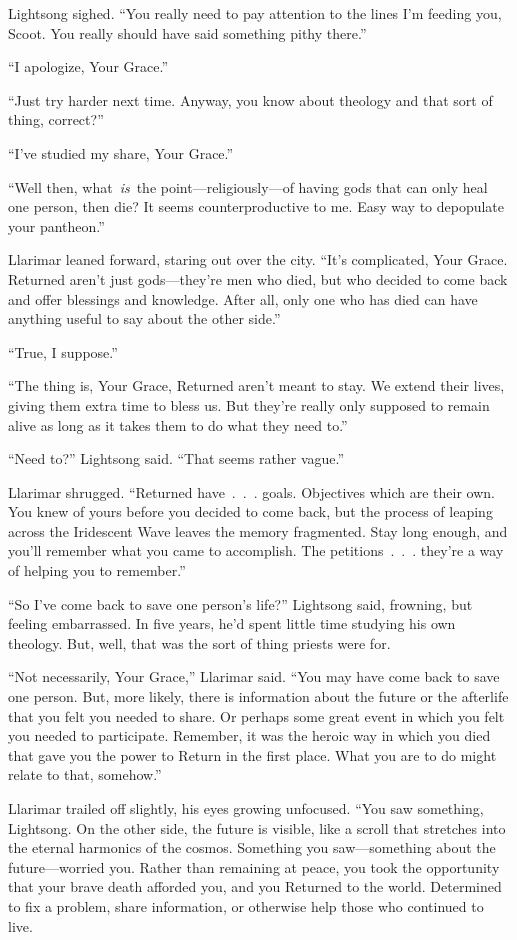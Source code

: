 Lightsong sighed. “You really need to pay attention to the lines I’m feeding you, Scoot. You really should have said something pithy there.”

“I apologize, Your Grace.”

“Just try harder next time. Anyway, you know about theology and that sort of thing, correct?”

“I’ve studied my share, Your Grace.”

“Well then, what~\textit{is}~the point—religiously—of having gods that can only heal one person, then die? It seems counterproductive to me. Easy way to depopulate your pantheon.”

Llarimar leaned forward, staring out over the city. “It’s complicated, Your Grace. Returned aren’t just gods—they’re men who died, but who decided to come back and offer blessings and knowledge. After all, only one who has died can have anything useful to say about the other side.”

“True, I suppose.”

“The thing is, Your Grace, Returned aren’t meant to stay. We extend their lives, giving them extra time to bless us. But they’re really only supposed to remain alive as long as it takes them to do what they need to.”

“Need to?” Lightsong said. “That seems rather vague.”

Llarimar shrugged. “Returned have~.~.~. goals. Objectives which are their own. You knew of yours before you decided to come back, but the process of leaping across the Iridescent Wave leaves the memory fragmented. Stay long enough, and you’ll remember what you came to accomplish. The petitions~.~.~. they’re a way of helping you to remember.”

“So I’ve come back to save one person’s life?” Lightsong said, frowning, but feeling embarrassed. In five years, he’d spent little time studying his own theology. But, well, that was the sort of thing priests were for.

“Not necessarily, Your Grace,” Llarimar said. “You may have come back to save one person. But, more likely, there is information about the future or the afterlife that you felt you needed to share. Or perhaps some great event in which you felt you needed to participate. Remember, it was the heroic way in which you died that gave you the power to Return in the first place. What you are to do might relate to that, somehow.”

Llarimar trailed off slightly, his eyes growing unfocused. “You saw something, Lightsong. On the other side, the future is visible, like a scroll that stretches into the eternal harmonics of the cosmos. Something you saw—something about the future—worried you. Rather than remaining at peace, you took the opportunity that your brave death afforded you, and you Returned to the world. Determined to fix a problem, share information, or otherwise help those who continued to live.

